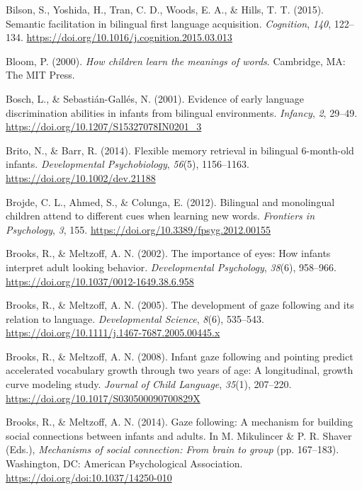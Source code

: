 \documentclass[english,,man,floatsintext]{apa6}
\begin{document}
\leavevmode\hypertarget{ref-Bilson_etal_2015}{}%
Bilson, S., Yoshida, H., Tran, C. D., Woods, E. A., \& Hills, T. T. (2015). Semantic facilitation in bilingual first language acquisition. \emph{Cognition}, \emph{140}, 122--134. \url{https://doi.org/10.1016/j.cognition.2015.03.013}

\leavevmode\hypertarget{ref-Bloom_2000}{}%
Bloom, P. (2000). \emph{How children learn the meanings of words}. Cambridge, MA: The MIT Press.

\leavevmode\hypertarget{ref-Bosch_Sebastian-Galles_2001}{}%
Bosch, L., \& Sebastián-Gallés, N. (2001). Evidence of early language discrimination abilities in infants from bilingual environments. \emph{Infancy}, \emph{2}, 29--49. \url{https://doi.org/10.1207/S15327078IN0201_3}

\leavevmode\hypertarget{ref-Brito_Barr_2014}{}%
Brito, N., \& Barr, R. (2014). Flexible memory retrieval in bilingual 6-month-old infants. \emph{Developmental Psychobiology}, \emph{56}(5), 1156--1163. \url{https://doi.org/10.1002/dev.21188}

\leavevmode\hypertarget{ref-Brojde_etal_2012}{}%
Brojde, C. L., Ahmed, S., \& Colunga, E. (2012). Bilingual and monolingual children attend to different cues when learning new words. \emph{Frontiers in Psychology}, \emph{3}, 155. \url{https://doi.org/10.3389/fpsyg.2012.00155}

\leavevmode\hypertarget{ref-Brooks_Meltzoff_2002}{}%
Brooks, R., \& Meltzoff, A. N. (2002). The importance of eyes: How infants interpret adult looking behavior. \emph{Developmental Psychology}, \emph{38}(6), 958--966. \url{https://doi.org/10.1037/0012-1649.38.6.958}

\leavevmode\hypertarget{ref-Brooks_Meltzoff_2005}{}%
Brooks, R., \& Meltzoff, A. N. (2005). The development of gaze following and its relation to language. \emph{Developmental Science}, \emph{8}(6), 535--543. \url{https://doi.org/10.1111/j.1467-7687.2005.00445.x}

\leavevmode\hypertarget{ref-Brooks_Meltzoff_2008}{}%
Brooks, R., \& Meltzoff, A. N. (2008). Infant gaze following and pointing predict accelerated vocabulary growth through two years of age: A longitudinal, growth curve modeling study. \emph{Journal of Child Language}, \emph{35}(1), 207--220. \url{https://doi.org/10.1017/S030500090700829X}

\leavevmode\hypertarget{ref-Brooks_Meltzoff_2014}{}%
Brooks, R., \& Meltzoff, A. N. (2014). Gaze following: A mechanism for building social connections between infants and adults. In M. Mikulincer \& P. R. Shaver (Eds.), \emph{Mechanisms of social connection: From brain to group} (pp. 167--183). Washington, DC: American Psychological Association. \url{https://doi.org/doi:10.1037/14250-010}
\end{document}
